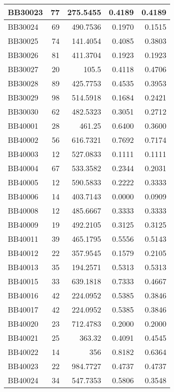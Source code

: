 \begin{longtable}{|l|r|r||r|r|}
	\hline
	BB30023 & 77    & 275.5455 & 0.4189 & 0.4189 \\
	\hline
	BB30024 & 69    & 490.7536 & 0.1970 & 0.1515 \\
	\hline
	BB30025 & 74    & 141.4054 & 0.4085 & 0.3803 \\
	\hline
	BB30026 & 81    & 411.3704 & 0.1923 & 0.1923 \\
	\hline
	BB30027 & 20    & 105.5 & 0.4118 & 0.4706 \\
	\hline
	BB30028 & 89    & 425.7753 & 0.4535 & 0.3953 \\
	\hline
	BB30029 & 98    & 514.5918 & 0.1684 & 0.2421 \\
	\hline
	BB30030 & 62    & 482.5323 & 0.3051 & 0.2712 \\
	\hline
	BB40001 & 28    & 461.25 & 0.6400 & 0.3600 \\
	\hline
	BB40002 & 56    & 616.7321 & 0.7692 & 0.7174 \\
	\hline
	BB40003 & 12    & 527.0833 & 0.1111 & 0.1111 \\
	\hline
	BB40004 & 67    & 533.3582 & 0.2344 & 0.2031 \\
	\hline
	BB40005 & 12    & 590.5833 & 0.2222 & 0.3333 \\
	\hline
	BB40006 & 14    & 403.7143 & 0.0000 & 0.0909 \\
	\hline
	BB40008 & 12    & 485.6667 & 0.3333 & 0.3333 \\
	\hline
	BB40009 & 19    & 492.2105 & 0.3125 & 0.3125 \\
	\hline
	BB40011 & 39    & 465.1795 & 0.5556 & 0.5143 \\
	\hline
	BB40012 & 22    & 357.9545 & 0.1579 & 0.2105 \\
	\hline
	BB40013 & 35    & 194.2571 & 0.5313 & 0.5313 \\
	\hline
	BB40015 & 33    & 639.1818 & 0.7333 & 0.4667 \\
	\hline
	BB40016 & 42    & 224.0952 & 0.5385 & 0.3846 \\
	\hline
	BB40017 & 42    & 224.0952 & 0.5385 & 0.3846 \\
	\hline
	BB40020 & 23    & 712.4783 & 0.2000 & 0.2000 \\
	\hline
	BB40021 & 25    & 363.32 & 0.4091 & 0.4545 \\
	\hline
	BB40022 & 14    & 356   & 0.8182 & 0.6364 \\
	\hline
	BB40023 & 22    & 984.7727 & 0.4737 & 0.4737 \\
	\hline
	BB40024 & 34    & 547.7353 & 0.5806 & 0.3548 \\

\end{longtable}
